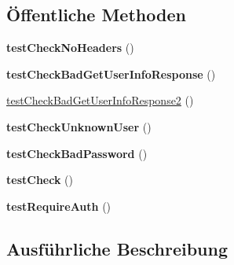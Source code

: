 \subsection*{Öffentliche Methoden}
\begin{DoxyCompactItemize}
\item 
\mbox{\label{class_sabre_1_1_d_a_v_1_1_auth_1_1_backend_1_1_abstract_digest_test_ac060df888f1cd2100716a0aaa561a59a}} 
{\bfseries test\+Check\+No\+Headers} ()
\item 
\mbox{\label{class_sabre_1_1_d_a_v_1_1_auth_1_1_backend_1_1_abstract_digest_test_ad6f6490c332f6109cf1506311d8f70d1}} 
{\bfseries test\+Check\+Bad\+Get\+User\+Info\+Response} ()
\item 
\mbox{\hyperlink{class_sabre_1_1_d_a_v_1_1_auth_1_1_backend_1_1_abstract_digest_test_afbd4574f741500b90146b69a141a47c6}{test\+Check\+Bad\+Get\+User\+Info\+Response2}} ()
\item 
\mbox{\label{class_sabre_1_1_d_a_v_1_1_auth_1_1_backend_1_1_abstract_digest_test_aa37b5b26049c3e5c1aace903806d09c8}} 
{\bfseries test\+Check\+Unknown\+User} ()
\item 
\mbox{\label{class_sabre_1_1_d_a_v_1_1_auth_1_1_backend_1_1_abstract_digest_test_a19686d5e22c4c017e6543e562987351d}} 
{\bfseries test\+Check\+Bad\+Password} ()
\item 
\mbox{\label{class_sabre_1_1_d_a_v_1_1_auth_1_1_backend_1_1_abstract_digest_test_a629e6a0d6cb1f8dd311eb1f3acef4f7c}} 
{\bfseries test\+Check} ()
\item 
\mbox{\label{class_sabre_1_1_d_a_v_1_1_auth_1_1_backend_1_1_abstract_digest_test_adf7e18a1cc39d7d16d4a0dafbf54cb59}} 
{\bfseries test\+Require\+Auth} ()
\end{DoxyCompactItemize}


\subsection{Ausführliche Beschreibung}


